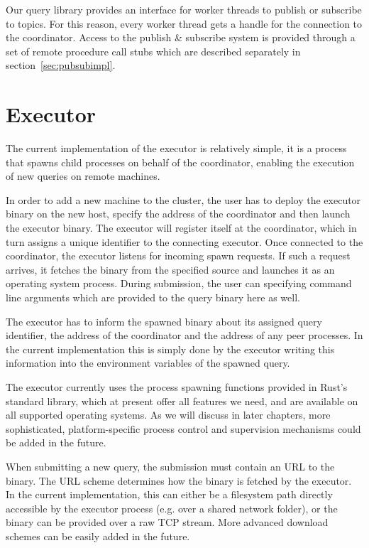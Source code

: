 Our query library provides an interface for worker threads to
publish or subscribe to topics. For this reason, every worker thread gets
a handle for the connection to the coordinator. Access to the
publish \& subscribe system is provided through a set of remote
procedure call stubs which are described separately in section~\ref{sec:pubsubimpl}.

\section{Executor}

The current implementation of the executor is relatively simple, it is a
process that spawns child processes on behalf of the coordinator, enabling
the execution of new queries on remote machines.

In order to add a new machine to the cluster, the user has to deploy the executor
binary on the new host, specify the address of the coordinator and then launch
the executor binary. The executor will register itself at the coordinator, which
in turn assigns a unique identifier to the connecting executor. Once connected to the
coordinator, the executor listens for incoming spawn requests. If such a
request arrives, it fetches the binary from the specified source and launches
it as an operating system process. During submission, the user can specifying
command line arguments which are provided to the query binary here as well.

The executor has to inform the spawned binary about its assigned query identifier,
the address of the coordinator and the address of any peer processes. In the
current implementation this is simply done by the executor writing this information
into the environment variables of the spawned query.

The executor currently uses the process spawning functions provided in Rust's standard
library, which at present offer all features we need, and are available on
all supported operating systems. As we will discuss in later chapters,
more sophisticated, platform-specific process control and supervision mechanisms
could be added in the future.

When submitting a new query, the submission must contain an URL to the binary.
The URL scheme determines how the binary is fetched by the executor. In the
current implementation, this can either be a filesystem path directly accessible by the
executor process (e.g. over a shared network folder), or the binary can be provided
over a raw TCP stream. More advanced download schemes can be easily added in
the future.


